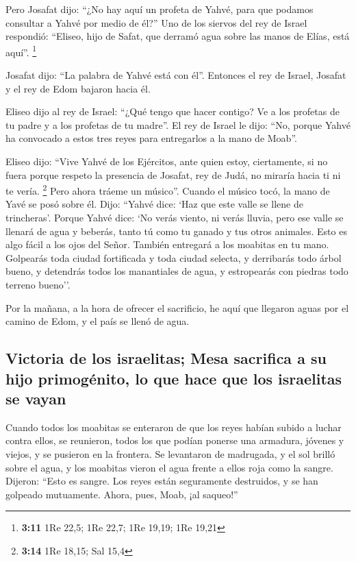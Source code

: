 \begin{paracol}{2}
 Pero Josafat dijo: ``¿No hay aquí un profeta de Yahvé,
para que podamos consultar a Yahvé por medio de él?'' Uno de los siervos
del rey de Israel respondió: ``Eliseo, hijo de Safat, que derramó agua
sobre las manos de Elías, está aquí''. \footnote{\textbf{3:11} 1Re 22,5;
  1Re 22,7; 1Re 19,19; 1Re 19,21}

 Josafat dijo: ``La palabra de Yahvé está con él''.
Entonces el rey de Israel, Josafat y el rey de Edom bajaron hacia él.

 Eliseo dijo al rey de Israel: ``¿Qué tengo que hacer
contigo? Ve a los profetas de tu padre y a los profetas de tu madre''.
El rey de Israel le dijo: ``No, porque Yahvé ha convocado a estos tres
reyes para entregarlos a la mano de Moab''.

 Eliseo dijo: ``Vive Yahvé de los Ejércitos, ante quien
estoy, ciertamente, si no fuera porque respeto la presencia de Josafat,
rey de Judá, no miraría hacia ti ni te vería. \footnote{\textbf{3:14}
  1Re 18,15; Sal 15,4}  Pero ahora tráeme un músico''.
Cuando el músico tocó, la mano de Yavé se posó sobre él. 
Dijo: ``Yahvé dice: `Haz que este valle se llene de trincheras'.
 Porque Yahvé dice: `No verás viento, ni verás lluvia,
pero ese valle se llenará de agua y beberás, tanto tú como tu ganado y
tus otros animales.  Esto es algo fácil a los ojos del
Señor. También entregará a los moabitas en tu mano. 
Golpearás toda ciudad fortificada y toda ciudad selecta, y derribarás
todo árbol bueno, y detendrás todos los manantiales de agua, y
estropearás con piedras todo terreno bueno''.

 Por la mañana, a la hora de ofrecer el sacrificio, he
aquí que llegaron aguas por el camino de Edom, y el país se llenó de
agua.

\hypertarget{victoria-de-los-israelitas-mesa-sacrifica-a-su-hijo-primoguxe9nito-lo-que-hace-que-los-israelitas-se-vayan}{%
\subsection{Victoria de los israelitas; Mesa sacrifica a su hijo
primogénito, lo que hace que los israelitas se
vayan}\label{victoria-de-los-israelitas-mesa-sacrifica-a-su-hijo-primoguxe9nito-lo-que-hace-que-los-israelitas-se-vayan}}

 Cuando todos los moabitas se enteraron de que los reyes
habían subido a luchar contra ellos, se reunieron, todos los que podían
ponerse una armadura, jóvenes y viejos, y se pusieron en la frontera.
 Se levantaron de madrugada, y el sol brilló sobre el
agua, y los moabitas vieron el agua frente a ellos roja como la sangre.
 Dijeron: ``Esto es sangre. Los reyes están seguramente
destruidos, y se han golpeado mutuamente. Ahora, pues, Moab, ¡al
saqueo!''


\end{paracol}
